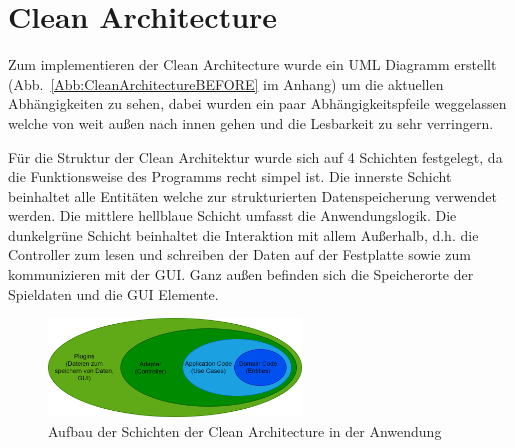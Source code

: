 \chapter{Clean Architecture}\label{cleanArchitecture}

Zum implementieren der Clean Architecture wurde ein UML Diagramm erstellt (Abb.~\ref{Abb:CleanArchitectureBEFORE} im Anhang) um die aktuellen Abhängigkeiten zu sehen, dabei wurden ein paar Abhängigkeitspfeile weggelassen welche von weit außen nach innen gehen und die Lesbarkeit zu sehr verringern. 


Für die Struktur der Clean Architektur wurde sich auf 4 Schichten festgelegt, da die Funktionsweise des Programms recht simpel ist. Die innerste Schicht beinhaltet alle Entitäten welche zur strukturierten Datenspeicherung verwendet werden. Die mittlere hellblaue Schicht umfasst die Anwendungslogik. Die dunkelgrüne Schicht beinhaltet die Interaktion mit allem Außerhalb, d.h. die Controller zum lesen und schreiben der Daten auf der Festplatte sowie zum kommunizieren mit der GUI. Ganz außen befinden sich die Speicherorte der Spieldaten und die GUI Elemente. 


\begin{figure}[!ht]
  \centering
  \includegraphics[width=0.6\textwidth]{Bilder/ArchitekturSchichten.PNG}
  \caption{Aufbau der Schichten der Clean Architecture in der Anwendung}
  \label{Abb:ArchitekturSchichten}
\end{figure}

